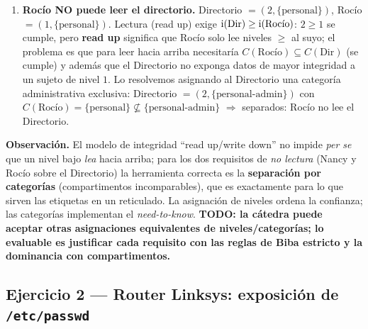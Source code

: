 \begin{enumerate}[leftmargin=1.9em]
\begin{itemize}
                $\{\text{quirófano},\text{personal}\}\not\subseteq\{\text{personal}\}$
                $\Rightarrow$ \emph{no escribe}. \checkmark
        \end{itemize}
        (Alternativamente, basta con que el bajo nivel de integridad de Rocío, $\il=1$, le impida
        escribir a doctores/enfermeras, y que la categoría quirófano de la prescripción la separe
        de escribir, mientras se le da lectura por compartir ``personal''.)
  \item \textbf{Rocío NO puede leer el directorio.} Directorio $=(2,\{\text{personal}\})$, Rocío
        $=(1,\{\text{personal}\})$. Lectura (read up) exige $\mathrm{i}(\text{Dir})\ge\mathrm{i}(\text{Rocío})$:
        $2\ge 1$ se cumple, pero \textbf{read up} significa que Rocío solo lee niveles
        $\ge$ al suyo; el problema es que para leer hacia arriba necesitaría
        $C(\text{Rocío})\subseteq C(\text{Dir})$ (se cumple) y además que el Directorio no exponga
        datos de mayor integridad a un sujeto de nivel $1$. Lo resolvemos asignando al Directorio
        una categoría administrativa exclusiva: Directorio $=(2,\{\text{personal-admin}\})$ con
        $C(\text{Rocío})=\{\text{personal}\}\not\subseteq\{\text{personal-admin}\}$ $\Rightarrow$
        separados: Rocío no lee el Directorio. \checkmark
\end{enumerate}

\textbf{Observación.} El modelo de integridad ``read up/write down'' no impide \emph{per se} que
un nivel bajo \emph{lea} hacia arriba; para los dos requisitos de \emph{no lectura} (Nancy y
Rocío sobre el Directorio) la herramienta correcta es la \textbf{separación por categorías}
(compartimentos incomparables), que es exactamente para lo que sirven las etiquetas en un
reticulado. La asignación de niveles ordena la confianza; las categorías implementan el
\emph{need-to-know}. \textbf{TODO: la cátedra puede aceptar otras asignaciones equivalentes de
niveles/categorías; lo evaluable es justificar cada requisito con las reglas de Biba estricto y
la dominancia con compartimentos.}

\subsection{Ejercicio 2 — Router Linksys: exposición de \texttt{/etc/passwd}}

